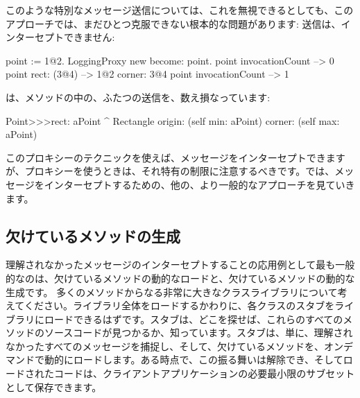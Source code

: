 \documentclass[a4paper,10pt,twoside]{book}
\begin{document}
このような特別なメッセージ送信については、これを無視できるとしても、このアプローチでは、まだひとつ克服できない根本的な問題があります: \self{}送信は、インターセプトできません:
\begin{code}{}
point := 1@2.
LoggingProxy new become: point.
point invocationCount --> 0
point rect: (3@4)        --> 1@2 corner: 3@4
point invocationCount --> 1
\end{code}

は、メソッドの中の、ふたつの\self{}送信を、数え損なっています: %
\begin{code}{}
Point>>>rect: aPoint 
	^ Rectangle  origin: (self min: aPoint) corner: (self max: aPoint)
\end{code}

このプロキシーのテクニックを使えば、メッセージをインターセプトできますが、プロキシーを使うときは、それ特有の制限に注意するべきです。では、メッセージをインターセプトするための、他の、より一般的なアプローチを見ていきます。

\subsection{欠けているメソッドの生成}

理解されなかったメッセージのインターセプトすることの応用例として最も一般的なのは、欠けているメソッドの動的なロードと、欠けているメソッドの動的な生成です。
多くのメソッドからなる非常に大きなクラスライブラリについて考えてください。ライブラリ全体をロードするかわりに、各クラスのスタブをライブラリにロードできるはずです。スタブは、どこを探せば、これらのすべてのメソッドのソースコードが見つかるか、知っています。スタブは、単に、理解されなかったすべてのメッセージを捕捉し、そして、欠けているメソッドを、オンデマンドで動的にロードします。ある時点で、この振る舞いは解除でき、そしてロードされたコードは、クライアントアプリケーションの必要最小限のサブセットとして保存できます。
\end{document}

